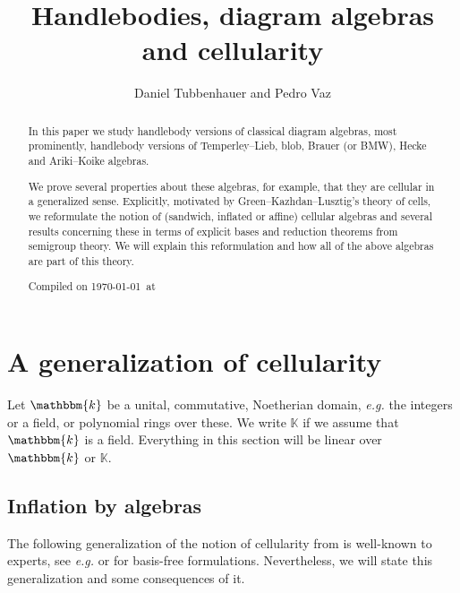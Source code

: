 \documentclass[a4paper,11pt]{amsart}
\title[Handlebodies, diagram algebras and cellularity]
{Handlebodies, diagram algebras and cellularity}
\author[Daniel Tubbenhauer and Pedro Vaz]{Daniel Tubbenhauer and Pedro Vaz}
\newcommand{\eg}{\textsl{e.g.}}
\newcommand{\K}{\mathbb{K}}
\newcommand{\KK}{\mathbbm{k}}
\numberwithin{equation}{section}
\renewcommand{\theequation}{\thesection-\arabic{equation}}
\begin{document}
\begin{abstract}
In this paper we study handlebody versions 
of classical diagram algebras, most prominently, 
handlebody versions of Temperley--Lieb, blob, 
Brauer (or BMW), Hecke and Ariki--Koike algebras.

We prove several properties 
about these algebras, for example, that they are cellular 
in a generalized sense.
Explicitly, motivated by Green--Kazhdan--Lusztig's 
theory of cells, we reformulate the notion of 
(sandwich, inflated or affine) cellular algebras 
and several results concerning these in terms of 
explicit bases and reduction theorems 
from semigroup theory.
We will explain this reformulation
and how all of the above algebras 
are part of this theory.

Compiled on \today\ at \currenttime
\end{abstract}

\renewcommand{\theequation}{\thesection-\arabic{equation}}


\maketitle

\tableofcontents




\section{A generalization of cellularity}\label{section:cells}

Let $\KK$ be a unital, commutative, Noetherian domain, {\eg} 
the integers or a field, or polynomial rings over these. 
We write $\K$ if we assume that $\KK$ is a field. Everything 
in this section will be linear over $\KK$ or $\K$.

\subsection{Inflation by algebras}\label{subsection:groups-inflation}

The following generalization of the notion 
of cellularity from \cite{GrLe-cellular} is well-known 
to experts, see {\eg} \cite{KoXi-cellular-inflation-morita}
or \cite{GuWi-almost-cellular} for
basis-free formulations.
Nevertheless, we will state this generalization and some consequences 
of it.
\end{document}
